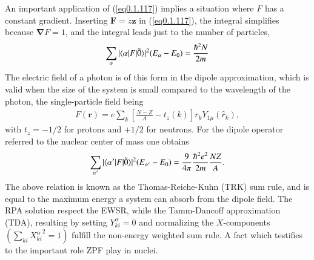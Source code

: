 An important application of (\ref{eq0.1.117}) implies a situation where $F$ has a constant gradient. Inserting $\mathbf F=z\mathbf z$ in (\ref{eq0.1.117}), the integral simplifies because $\pmb \nabla F=1$, and the integral leads just to the number of particles,
\begin{align}\label{eq0.1.118}
\sum_{\alpha}|\langle {\alpha|F|\tilde 0} \rangle|^2(E_{\alpha}-E_0)=\frac{\hbar^2N}{2m}
\end{align}
The electric field of a photon is of this form in the dipole approximation, which is valid when the size of the system is small compared to the wavelength of the photon, the single-particle field being
\begin{align}\label{eq0.1.119}
F(\mathbf r)=e\sum_{k}\left[\frac{N-Z}{A}-t_z(k)\right]r_kY_{1\mu}(\hat r_k),
\end{align}
with $t_z=-1/2$ for protons and $+1/2$ for neutrons. For the dipole operator referred to the nuclear center of mass one obtains
\begin{align}\label{eq0.1.120}
\sum_{\alpha'}|\langle {\alpha'|F|\tilde 0} \rangle|^2(E_{\alpha'}-E_0)=\frac{9}{4\pi}\frac{\hbar^2e^2}{2m}\frac{NZ}{A}.
\end{align}
 The above relation is known as the Thomas-Reiche-Kuhn (TRK) sum rule, and is equal to the maximum energy a system can absorb from the dipole field. The RPA solution respect the EWSR, while the Tamm-Dancoff approximation (TDA), resulting by setting $Y^\alpha_{ki}=0$ and normalizing the $X$-components $(\sum_{ki}{X^{\alpha}_{ki}}^2=1)$ fulfill the non-energy weighted sum rule. A fact which testifies to the important role ZPF play in nuclei.
